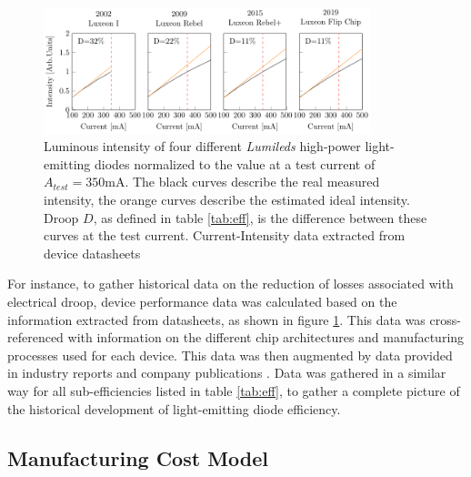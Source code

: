 \documentclass[a4paper,nocompress]{spie}  %
\begin{document}
        \begin{figure} [ht]
            \begin{center}
                \includegraphics[width=0.85\textwidth]{SPIE/article/droop_lumileds.pdf}
            \end{center}
            \caption{Luminous intensity of four different \textit{Lumileds} high-power light-emitting diodes normalized to the value at a test current of $A_{test}=350$mA. The black curves describe the real measured intensity, the orange curves describe the estimated ideal intensity. Droop $D$, as defined in table \ref{tab:eff}, is the difference between these curves at the test current. Current-Intensity data extracted from device datasheets \cite{datasheet_lumileds_lux1,datasheet_lumileds_rebel,datasheet_lumileds_rebplus,lumi2019data}}
            \label{fig:droop}
        \end{figure}
        
        For instance, to gather historical data on the reduction of losses associated with electrical droop, device performance data was calculated based on the information extracted from datasheets, as shown in figure \ref{fig:droop}. This data was cross-referenced with information on the different chip architectures and manufacturing processes used for each device. This data was then augmented by data provided in industry reports and company publications \cite{osram2014osram}. Data was gathered in a similar way for all sub-efficiencies listed in table \ref{tab:eff}, to gather a complete picture of the historical development of light-emitting diode efficiency.

    \subsection{Manufacturing Cost Model}
\end{document}
